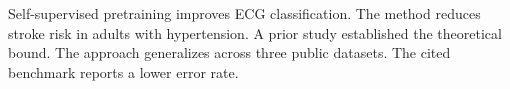 Self-supervised pretraining improves ECG classification.
The method reduces stroke risk in adults with hypertension.
A prior study established the theoretical bound.
The approach generalizes across three public datasets.
The cited benchmark reports a lower error rate.
